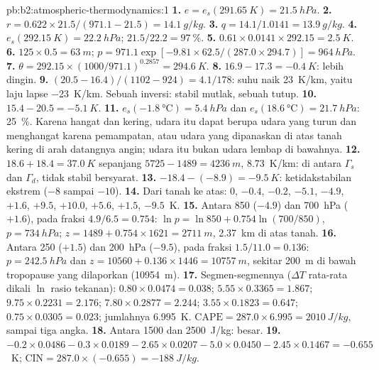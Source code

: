 \begin{solution}{pb:b2:atmospheric-thermodynamics:1}
\textbf{1.} $e = e_s(\qty{291.65}{K}) = \qty{21.5}{hPa}$.
\textbf{2.} $r = 0.622 \times 21.5/(971.1 - 21.5) = \qty{14.1}{g/kg}$.
\textbf{3.} $q = 14.1/1.0141 = \qty{13.9}{g/kg}$.
\textbf{4.} $e_s(\qty{292.15}{K}) = \qty{22.2}{hPa}$; $21.5/22.2 = \qty{97}{\percent}$.
\textbf{5.} $0.61 \times 0.0141 \times 292.15 = \qty{2.5}{K}$.
\textbf{6.} $125 \times 0.5 = \qty{63}{m}$; $p = 971.1 \exp[-9.81 \times 62.5/(287.0 \times 294.7)]
= \qty{964}{hPa}$.
\textbf{7.} $\theta = 292.15 \times (1000/971.1)^{0.2857} = \qty{294.6}{K}$.
\textbf{8.} $16.9 - 17.3 = \qty{-0.4}{K}$: lebih dingin.
\textbf{9.} $(20.5 - 16.4)/(1102 - 924) = 4.1/178$: suhu naik \qty{23}{K/km}, yaitu
laju lapse \qty{-23}{K/km}. Sebuah inversi: stabil mutlak, sebuah tutup.
\textbf{10.} $15.4 - 20.5 = \qty{-5.1}{K}$.
\textbf{11.} $e_s(\qty{-1.8}{\celsius}) = \qty{5.4}{hPa}$ dan $e_s(\qty{18.6}{\celsius}) =
\qty{21.7}{hPa}$: \qty{25}{\percent}. Karena hangat dan kering, udara itu dapat berupa udara yang turun dan menghangat karena
pemampatan, atau udara yang dipanaskan di atas tanah kering di arah datangnya angin; udara itu bukan udara lembap di bawahnya.
\textbf{12.} $18.6 + 18.4 = \qty{37.0}{K}$ sepanjang $5725 - 1489 = \qty{4236}{m}$, \qty{8.73}{K/km}: di antara $\Gamma_s$ dan
$\Gamma_d$, tidak stabil bersyarat.
\textbf{13.} $-18.4 - (-8.9) = \qty{-9.5}{K}$: ketidakstabilan ekstrem ($-8$ sampai $-10$).
\textbf{14.} Dari tanah ke atas: 0, $-0.4$, $-0.2$, $-5.1$, $-4.9$, $+1.6$, $+9.5$, $+10.0$,
$+5.6$, $+1.5$, $-9.5$~\unit{K}.
\textbf{15.} Antara 850 ($-4.9$) dan \qty{700}{hPa} ($+1.6$), pada fraksi $4.9/6.5 = 0.754$:
$\ln p = \ln 850 + 0.754 \ln(700/850)$, $p = \qty{734}{hPa}$; $z = 1489 + 0.754 \times 1621 =
\qty{2711}{m}$, \qty{2.37}{km} di atas tanah.
\textbf{16.} Antara 250 ($+1.5$) dan \qty{200}{hPa} ($-9.5$), pada fraksi $1.5/11.0 =
0.136$: $p = \qty{242.5}{hPa}$ dan $z = 10560 + 0.136 \times 1446 = \qty{10757}{m}$, sekitar
\qty{200}{m} di bawah tropopause yang dilaporkan (\qty{10954}{m}).
\textbf{17.} Segmen-segmennya ($\Delta T$ rata-rata dikali $\ln$ rasio tekanan): $0.80 \times 0.0474
= 0.038$; $5.55 \times 0.3365 = 1.867$; $9.75 \times 0.2231 = 2.176$; $7.80 \times 0.2877 =
2.244$; $3.55 \times 0.1823 = 0.647$; $0.75 \times 0.0305 = 0.023$; jumlahnya \qty{6.995}{K}.
$\text{CAPE} = 287.0 \times 6.995 = \qty{2010}{J/kg}$, sampai tiga angka.
\textbf{18.} Antara 1500 dan \qty{2500}{J/kg}: besar.
\textbf{19.} $-0.2 \times 0.0486 - 0.3 \times 0.0189 - 2.65 \times 0.0207 - 5.0 \times 0.0450 -
2.45 \times 0.1467 = -0.655$~\unit{K}; $\text{CIN} = 287.0 \times (-0.655) = \qty{-188}{J/kg}$.

\end{solution}
